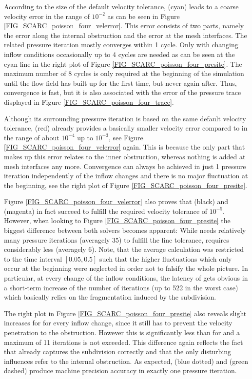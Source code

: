 According to the size of the default velocity tolerance, \fftdefault{} (cyan) leads to a coarse velocity error in the range of  $10^{-2}$ as can be seen in Figure \ref{FIG_SCARC_poisson_four_velerror}.  
This error consists of two parts, namely the error along the internal obstruction and the error at the mesh interfaces. The related pressure iteration mostly converges within 1 cycle. Only with changing inflow conditions occasionally up to 4 cycles are needed as can be seen at the cyan line in the right plot of Figure \ref{FIG_SCARC_poisson_four_presite}. The maximum number of 8 cycles is only required at the beginning of the simulation until the flow field has built up for the first time, but never again after. Thus, convergence is fast, but it is also associated with the error of the pressure trace displayed in Figure \ref{FIG_SCARC_poisson_four_trace}.

Although its surrounding pressure iteration is based on the same default velocity tolerance, 
\scarcdefault{} (red) already provides a basically smaller velocity error compared to \fftdefault{} in the range of about $10^{-4}$ up to $10^{-3}$, see Figure \ref{FIG_SCARC_poisson_four_velerror} again.
This is because the only part that makes up this error relates to the inner obstruction, whereas nothing is added at mesh interfaces any more.  Convergence can always be achieved in just 1 pressure iteration independently of the inflow changes and there is no major fluctuation at the beginning, see the right plot of Figure \ref{FIG_SCARC_poisson_four_presite}.

Figure \ref{FIG_SCARC_poisson_four_velerror} also proves that
\ffttight{} (black) and \scarctight{} (magenta) in fact succeed to fulfill the required velocity tolerance of $10^{-5}$. 
However, when looking to Figure \ref{FIG_SCARC_poisson_four_presite} the biggest difference between both solvers becomes apparent: While \ffttight{} needs relatively many pressure iterations (averagely 35) to fulfill the fine tolerance, \scarctight{} requires considerably less (averagely 6). 
Note, that the average calculation was restricted to the time interval $[0.05,0.5]$ such that the higher fluctuations which only occur at the beginning were neglected in order not to falsify the whole picture.
In particular, at every change of the inflow conditions, the latency of \ffttight{} gets obvious in a short-term increase of the number of iterations (up to 522 in the worst case) which basically relies on the fragmentation induced by the subdivision. 

The right plot in Figure \ref{FIG_SCARC_poisson_four_presite} also reveals slight increases for \scarctight{} for every inflow change, since it still has to prevent the velocity penetration to the obstruction. However this is significantly less than for \ffttight{} and a maximum of 11 iterations is not exceeded.
This difference again reflects the fact that \scarc{} already captures the subdivision correctly and that the only disturbing influences refer to the internal obstruction. As expected, \uglmat{} (blue dotted) and \uscarc{} (green dashed)
produce machine precision accuracy in exactly one pressure iteration.

